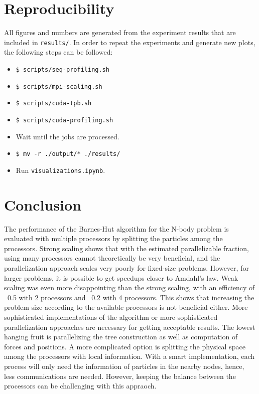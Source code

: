 \documentclass[10pt,journal,compsocconf]{IEEEtran}
\newcommand{\code}[1]{{\small \texttt{#1}}}
\begin{document}
\section{Reproducibility}

All figures and numbers are generated from the experiment results that are included in \code{results/}. In order to repeat the experiments and generate new plots, the following steps can be followed:
\begin{itemize}
    \item \code{\$ scripts/seq-profiling.sh}
    \item \code{\$ scripts/mpi-scaling.sh}
    \item \code{\$ scripts/cuda-tpb.sh}
    \item \code{\$ scripts/cuda-profiling.sh}
    \item Wait until the jobs are processed.
    \item \code{\$ mv -r ./output/* ./results/}
    \item Run \code{visualizations.ipynb}.
\end{itemize}

\section{Conclusion}

The performance of the Barnes-Hut algorithm for the N-body problem is evaluated with multiple processors by splitting the particles among the processors. Strong scaling shows that with the estimated parallelizable fraction, using many processors cannot theoretically be very beneficial, and the parallelization approach scales very poorly for fixed-size problems. However, for larger problems, it is possible to get speedups closer to Amdahl's law. Weak scaling was even more disappointing than the strong scaling, with an efficiency of ~0.5 with 2 processors and ~0.2 with 4 processors. This shows that increasing the problem size according to the available processors is not beneficial either. More sophisticated implementations of the algorithm or more sophisticated parallelization approaches are necessary for getting acceptable results. The lowest hanging fruit is parallelizing the tree construction as well as computation of forces and positions. A more complicated option is splitting the physical space among the processors with local information. With a smart implementation, each process will only need the information of particles in the nearby nodes, hence, less communications are needed. However, keeping the balance between the processors can be challenging with this appraoch.
\end{document}
